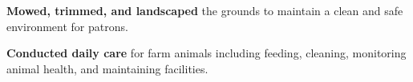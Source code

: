 \begin{bullets}
	\item \textbf{Mowed, trimmed, and landscaped} the grounds to maintain a clean and safe environment for patrons.
	\item \textbf{Conducted daily care} for farm animals including feeding, cleaning, monitoring animal health, and maintaining facilities.
\end{bullets}